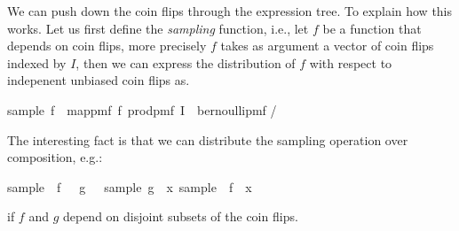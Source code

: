 We can push down the coin flips through the expression tree.
To explain how this works.
Let us first define the \emph{sampling} function, i.e., let $f$ be a function that depends on coin flips, more precisely $f$ takes as argument a vector of coin flips indexed by $I$, then we can express the distribution of $f$ with respect to indepenent unbiased coin flips as.
\begin{isabelle_cm}
  sample\ f\ \isacharequal\ map{\isacharunderscore}pmf\ f\ {\isacharparenleft}prod{\isacharunderscore}pmf\ I\ {\isacharparenleft}\isasymlambda\isacharunderscore\isachardot\ bernoulli{\isacharunderscore}pmf \isacharparenleft{}/\isacharparenright\isacharparenright\isacharparenright
\end{isabelle_cm}
The interesting fact is that we can distribute the sampling operation over composition, e.g.:
\begin{isabelle_cm}
  sample\ \isacharparenleft\isasymlambda\isasymomega\isachardot\ f\ \isasymomega\ \isasymcirc\ g\ \isasymomega{\isacharparenright}\ \isacharequal\ sample\ g\ \isasymbind\ \isacharparenleft{\isasymlambda}x\isachardot\ sample\ \isacharparenleft\isasymlambda\isasymomega\isachardot\ f\ \isasymomega\isachardot\ x\isacharparenright\isacharparenright
\end{isabelle_cm}
if $f$ and $g$ depend on disjoint subsets of the coin flips.





